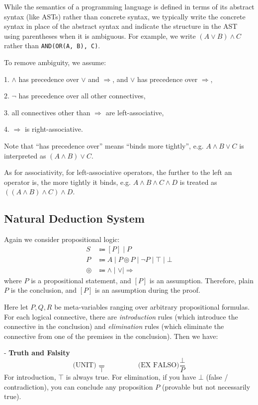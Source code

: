 While the semantics of a programming language is defined in terms of its abstract syntax (like ASTs) rather than concrete syntax, we typically write the concrete syntax in place of the abstract syntax and indicate the structure in the AST using parentheses when it is ambiguous. For example, we write \((A \vee B) \wedge C\) rather than \texttt{AND(OR(A, B), C)}. 

To remove ambiguity, we assume:

1. \(\wedge\) has precedence over \(\vee\) and \(\Rightarrow\), and \(\vee\) has precedence over \(\Rightarrow\), 

2. \(\neg\) has precedence over all other connectives,

3. all connectives other than \(\Rightarrow\) are left-associative,

4. \(\Rightarrow\) is right-associative.

Note that “has precedence over” means “binds more tightly”, e.g. \(A \wedge B \vee C\) is interpreted as \((A \wedge B) \vee C\). 

As for associativity, for left-associative operators, the further to the left an operator is, the more tightly it binds, e.g. \(A \wedge B \wedge C \wedge D\) is treated as \(((A \wedge B) \wedge C) \wedge D\). 

\subsection{Natural Deduction System}
Again we consider propositional logic:
\[
  \begin{aligned}
    S &\Coloneqq [P] \mid P \\
    P &\Coloneqq A \mid P \circledcirc P \mid \neg P \mid \top \mid \bot \\
    \circledcirc &\Coloneqq \wedge \mid \vee \mid \Rightarrow
  \end{aligned}
\]
where \(P\) is a propositional statement, and \([P]\) is an assumption. Therefore, plain \(P\) is the conclusion, and \([P]\) is an assumption during the proof. 

Here let \(P, Q, R\) be meta-variables ranging over arbitrary propositional formulas. For each logical connective, there are \textit{introduction} rules (which introduce the connective in the conclusion) and \textit{elimination} rules (which eliminate the connective from one of the premises in the conclusion). Then we have:

- \textbf{Truth and Falsity}
\[
\text{(UNIT) } \dfrac{}{\top} \hspace{2cm} \text{(EX FALSO)} \dfrac{\bot}{P}
\]
For introduction, \(\top\) is always true. For elimination, if you have \(\bot\) (false / contradiction), you can conclude any proposition \(P\) (provable but not necessarily true).

